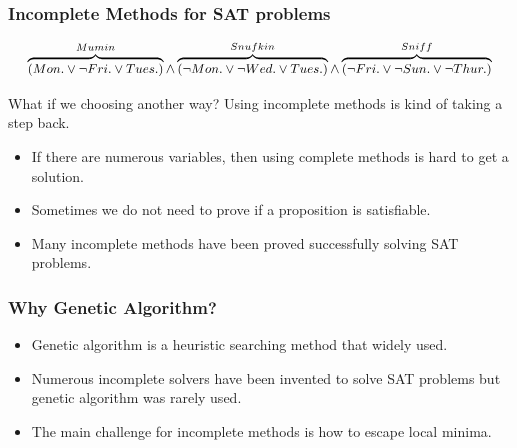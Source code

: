 \begin{frame}
	\frametitle{Incomplete Methods for SAT problems}
	\begin{equation*}
	\small
		\overbrace{(Mon. \vee \neg Fri. \vee Tues.)}^{Mumin} \wedge \overbrace{(\neg Mon. \vee \neg Wed. \vee Tues.)}^{Snufkin} \wedge \overbrace{(\neg Fri. \vee \neg Sun. \vee \neg Thur.)}^{Sniff}
	\end{equation*}
	\large	
	\begin{alertblock}{What if we choosing another way?}
		Using incomplete methods is kind of taking a step back.
		\begin{itemize}
	\normalsize
		\item If there are numerous variables, then using complete methods is hard to get a solution.
		\item Sometimes we do not need to prove if a proposition is satisfiable.
		\item Many incomplete methods have been proved successfully solving SAT problems.
	\end{itemize}
	\end{alertblock}
	
	
\end{frame}

\begin{frame}
	\frametitle{Why Genetic Algorithm?}
	\Large
	\begin{itemize}
		\item Genetic algorithm is a heuristic searching method that widely used.
		\item Numerous incomplete solvers have been invented to solve SAT problems but genetic algorithm was rarely used.
		\item The main challenge for incomplete methods is how to escape local minima.
	\end{itemize}
	
\end{frame}